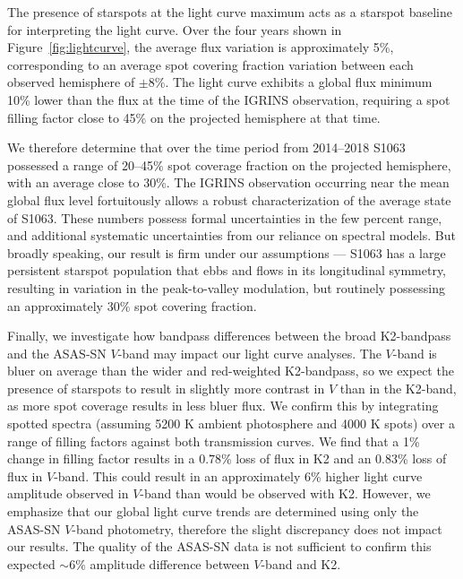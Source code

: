 \documentclass[twocolumn,tighten]{aastex631}
\begin{document}
The presence of starspots at the light curve maximum acts as a starspot baseline for interpreting the light curve. Over the four years shown in Figure~\ref{fig:lightcurve}, the average flux variation is approximately 5\%, corresponding to an average spot covering fraction variation between each observed hemisphere of $\pm$8\%. The light curve exhibits a global flux minimum 10\% lower than the flux at the time of the IGRINS observation, requiring a spot filling factor close to 45\% on the projected hemisphere at that time.  

We therefore determine that over the time period from 2014--2018 S1063 possessed a range of 20--45\% spot coverage fraction on the projected hemisphere, with an average close to 30\%. The IGRINS observation occurring near the mean global flux level fortuitously allows a robust characterization of the average state of S1063. These numbers possess formal uncertainties in the few percent range, and additional systematic uncertainties from our reliance on spectral models.  But broadly speaking, our result is firm under our assumptions --- S1063 has a large persistent starspot population that ebbs and flows in its longitudinal symmetry, resulting in variation in the peak-to-valley modulation, but routinely possessing an approximately 30\% spot covering fraction.

Finally, we investigate how bandpass differences between the broad K2-bandpass and the ASAS-SN $V$-band may impact our light curve analyses. The $V$-band is bluer on average than the wider and red-weighted K2-bandpass, so we expect the presence of starspots to result in slightly more contrast in $V$ than in the K2-band, as more spot coverage results in less bluer flux. We confirm this by integrating spotted spectra (assuming 5200 K ambient photosphere and 4000 K spots) over a range of filling factors against both transmission curves. We find that a 1\% change in filling factor results in a $0.78$\% loss of flux in K2 and an $0.83$\% loss of flux in $V$-band. This could result in an approximately 6\% higher light curve amplitude observed in $V$-band than would be observed with K2. However, we emphasize that our global light curve trends are determined using only the ASAS-SN $V$-band photometry, therefore the slight discrepancy does not impact our results. The quality of the ASAS-SN data is not sufficient to confirm this expected $\sim6$\% amplitude difference between $V$-band and K2. 
\end{document}
